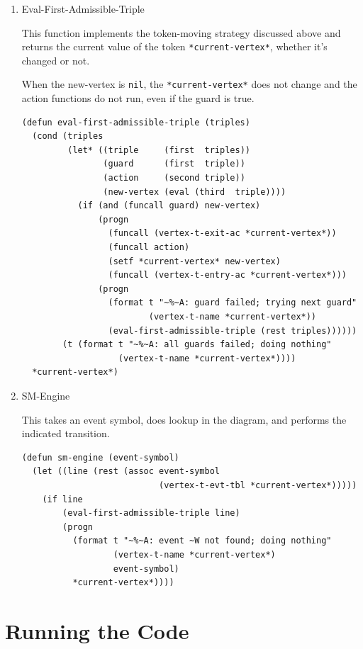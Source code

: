 \documentclass[10pt,oneside,x11names]{article}
\begin{document}
\begin{enumerate}
\item Eval-First-Admissible-Triple
\label{sec:org6864f0e}

This function implements the token-moving strategy discussed above and
returns the current value of the token \texttt{*current-vertex*}, whether it's
changed or not.

When the new-vertex is \texttt{nil}, the \texttt{*current-vertex*} does not change and the
action functions do not run, even if the guard is true.

\begin{verbatim}
(defun eval-first-admissible-triple (triples)
  (cond (triples
         (let* ((triple     (first  triples))
                (guard      (first  triple))
                (action     (second triple))
                (new-vertex (eval (third  triple))))
           (if (and (funcall guard) new-vertex)
               (progn
                 (funcall (vertex-t-exit-ac *current-vertex*))
                 (funcall action)
                 (setf *current-vertex* new-vertex)
                 (funcall (vertex-t-entry-ac *current-vertex*)))
               (progn
                 (format t "~%~A: guard failed; trying next guard"
                         (vertex-t-name *current-vertex*))
                 (eval-first-admissible-triple (rest triples))))))
        (t (format t "~%~A: all guards failed; doing nothing"
                   (vertex-t-name *current-vertex*))))
  *current-vertex*)
\end{verbatim}

\item SM-Engine
\label{sec:org7114f59}

This takes an event symbol, does lookup in the diagram, and performs the
indicated transition.

\begin{verbatim}
(defun sm-engine (event-symbol)
  (let ((line (rest (assoc event-symbol
                           (vertex-t-evt-tbl *current-vertex*)))))
    (if line
        (eval-first-admissible-triple line)
        (progn
          (format t "~%~A: event ~W not found; doing nothing"
                  (vertex-t-name *current-vertex*)
                  event-symbol)
          *current-vertex*))))

\end{verbatim}
\end{enumerate}

\section{Running the Code}
\label{sec:org8f1d1df}
\end{document}
